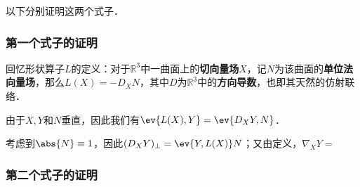 以下分别证明这两个式子．

\subsubsection{第一个式子的证明}

回忆形状算子$L$的定义：对于$\mathbb{R}^3$中一曲面上的\textbf{切向量场}$X$，记$N$为该曲面的\textbf{单位法向量场}，那么$L(X)=-D_XN$，其中$D$为$\mathbb{R}^3$中的\textbf{方向导数}，也即其天然的仿射联络．

由于$X, Y$和$N$垂直，因此我们有$\ev{L(X), Y}=\ev{D_XY, N}$．

考虑到$\abs{N}\equiv 1$，因此$(D_XY)_\perp=\ev{Y, L(X)}N$；又由定义，$\nabla_XY=$




\subsubsection{第二个式子的证明}






















